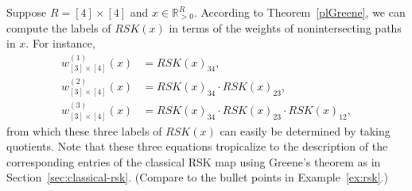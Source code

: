 \documentclass[ALCO,Unicode,published]{cedram}
\numberwithin{equation}{section}
\begin{document}
\begin{Ex} \label{ex:rsk2}
    Suppose $R = [4] \times [4]$ and $x \in \mathbb R_{>0}^R$. According to Theorem~\ref{plGreene}, we can compute the labels of $RSK(x)$ in terms of the weights of nonintersecting paths in $x$. For instance,
    \begin{align*}
        w_{[3] \times [4]}^{(1)}(x) &= RSK(x)_{34},\\
        w_{[3] \times [4]}^{(2)}(x) &= RSK(x)_{34} \cdot RSK(x)_{23}, \\
        w_{[3] \times [4]}^{(3)}(x) &= RSK(x)_{34} \cdot RSK(x)_{23} \cdot RSK(x)_{12},
    \end{align*}
    from which these three labels of $RSK(x)$ can easily be determined by taking quotients. Note that these three equations tropicalize to the description of the corresponding entries of the classical RSK map using Greene's theorem as in Section~\ref{sec:classical-rsk}. (Compare to the bullet points in Example~\ref{ex:rsk}.) 
    

\end{Ex}
\end{document}
